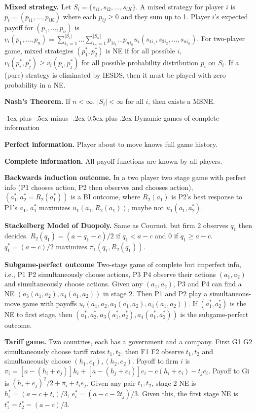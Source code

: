 \documentclass[a4paper,11pt,landscape]{article}
\makeatletter
\renewcommand{\section}{\@startsection{section}{1}{0mm}%
                                {-1ex plus -.5ex minus -.2ex}%
                                {0.5ex plus .2ex}%
                                {\normalfont\large\bfseries}}
\makeatother
\begin{document}
\begin{multicols*}{3}
\textbf{Mixed strategy.} Let $S_i=\{s_{i1},s_{i2},\ldots,s_{iK}\}$. A mixed strategy for player $i$ is $p_i=(p_{i1},\ldots,p_{iK})$ where each $p_{ij}\geq0$ and they sum up to 1. Player $i$'s expected payoff for $(p_1,\ldots,p_n)$ is $v_i(p_1,\ldots,p_n)=\sum_{i_1=1}^{|S_1|}\ldots\sum_{i_n=1}^{|S_n|}p_{1i_1}\ldots p_{ni_n}u_i(s_{1i_1}, s_{2i_2},\ldots,s_{ni_n})$. For two-player game, mixed strategies $(p_1^*,p_2^*)$ is NE if for all possible $i$, $v_i(p_i^*,p_j^*)\geq v_i(p_i,p_j^*)$ for all possible probability distribution $p_i$ on $S_i$. If a (pure) strategy is eliminated by IESDS, then it must be played with zero probability in a NE.

\textbf{Nash's Theorem.} If $n<\infty$, $|S_i|<\infty$ for all $i$, then exists a MSNE.

\section{Dynamic games of complete information}

\textbf{Perfect information.} Player about to move knows full game history.

\textbf{Complete information.} All payoff functions are known by all players.
 
\textbf{Backwards induction outcome.} In a two player two stage game with perfect info (P1 chooses action, P2 then observes and chooses action), $(a_1^*,a_2^*=R_2(a_1^*))$ is a BI outcome, where $R_2(a_1)$ is P2's best response to P1's $a_1$, $a_1^*$ maximizes $u_1(a_1,R_2(a_1))$, maybe not $u_1(a_1,a_2^*)$.

\textbf{Stackelberg Model of Duopoly.} Same as Cournot, but firm 2 observes $q_1$ then decides. $R_2(q_1)=(a-q_1-c)/2$ if $q_1<a-c$ and 0 if $q_1\geq a-c$. $q_1^*=(a-c)/2$ maximizes $\pi_1(q_1,R_2(q_1))$.

\textbf{Subgame-perfect outcome} Two-stage game of complete but imperfect info, i.e., P1 P2 simultaneously choose actions, P3 P4 observe their actions $(a_1,a_2)$ and simultaneously choose actions. Given any $(a_1,a_2)$, P3 and P4 can find a NE $(a_3(a_1,a_2),a_4(a_1,a_2))$ in stage 2. Then P1 and P2 play a simultaneous-move game with payoffs $u_i(a_1,a_2,a_3(a_1,a_2),a_4(a_1,a_2))$. If $(a_1^*,a_2^*)$ is the NE to first stage, then $(a_1^*,a_2^*,a_3(a_1^*,a_2^*),a_4(a_1^*,a_2^*))$ is the subgame-perfect outcome.

\textbf{Tariff game.} Two countries, each has a government and a company. First G1 G2 simultaneously choose tariff rates $t_1,t_2$, then F1 F2 observe $t_1,t_2$ and simultaneously choose $(h_1,e_1),(h_2,e_2)$. Payoff to firm $i$ is $\pi_i=[a-(h_i+e_j)]h_i+[a-(h_j+e_i)]e_i-c(h_i+e_i)-t_je_i$. Payoff to Gi is $(h_i+e_j)^2/2+\pi_i+t_ie_j$. Given any pair $t_1,t_2$, stage 2 NE is $h_i^*=(a-c+t_i)/3$, $e_i^*=(a-c-2t_j)/3$. Given this, the first stage NE is $t_1^*=t_2^*=(a-c)/3$.


\end{multicols*}
\end{document}
